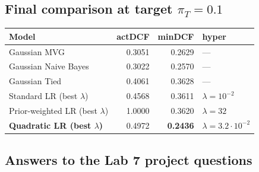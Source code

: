 \documentclass[11pt,a4paper]{article}
\begin{document}
\subsection{Final comparison at target $\pi_T = 0.1$}

\begin{table}[H]
\centering
\begin{tabular}{lrrl}
\toprule
Model                            & actDCF  & minDCF           & hyper \\
\midrule
Gaussian MVG                     & 0.3051  & 0.2629           & --- \\
Gaussian Naive Bayes             & 0.3022  & 0.2570           & --- \\
Gaussian Tied                    & 0.4061  & 0.3628           & --- \\
Standard LR (best $\lambda$)     & 0.4568  & 0.3611           & $\lambda=10^{-2}$ \\
Prior-weighted LR (best $\lambda$)& 1.0000 & 0.3620           & $\lambda=32$ \\
\textbf{Quadratic LR (best $\lambda$)} & 0.4972 & \textbf{0.2436} & $\lambda=3.2\cdot 10^{-2}$ \\
\bottomrule
\end{tabular}
\end{table}

\subsection{Answers to the Lab 7 project questions}
\end{document}

